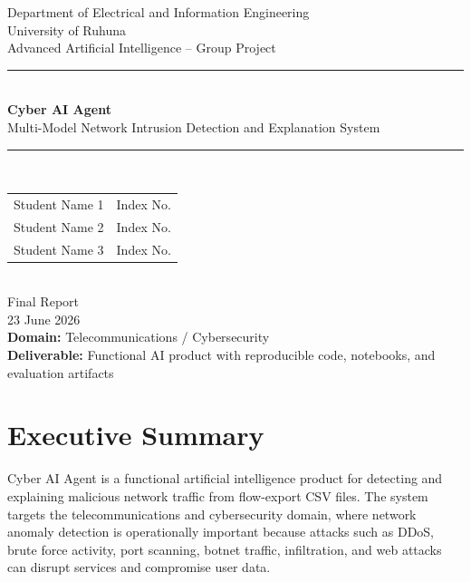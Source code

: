 \documentclass[12pt,a4paper]{article}
\begin{document}
\begin{titlepage}
    \centering
    \vspace*{0.8cm}
    {\Large Department of Electrical and Information Engineering}\\[0.25cm]
    {\Large University of Ruhuna}\\[1.2cm]
    {\Large Advanced Artificial Intelligence -- Group Project}\\[0.4cm]
    \rule{\linewidth}{0.5mm}\\[0.3cm]
    {\huge \bfseries Cyber AI Agent}\\[0.25cm]
    {\Large Multi-Model Network Intrusion Detection and Explanation System}\\[0.3cm]
    \rule{\linewidth}{0.5mm}\\[1.0cm]

    \begin{tabular}{l l}
        Student Name 1 & Index No. \\
        Student Name 2 & Index No. \\
        Student Name 3 & Index No. \\
    \end{tabular}\\[1.0cm]

    {\large Final Report}\\[0.2cm]
    {\large 23 June 2026}\\[1.0cm]

    \vfill
    \textbf{Domain:} Telecommunications / Cybersecurity\\
    \textbf{Deliverable:} Functional AI product with reproducible code, notebooks, and evaluation artifacts
    \vfill
\end{titlepage}

\newpage
\tableofcontents
\newpage
\listoffigures
\listoftables
\newpage
{}

\section{Executive Summary}

Cyber AI Agent is a functional artificial intelligence product for detecting and explaining malicious network traffic from flow-export CSV files. The system targets the telecommunications and cybersecurity domain, where network anomaly detection is operationally important because attacks such as DDoS, brute force activity, port scanning, botnet traffic, infiltration, and web attacks can disrupt services and compromise user data.
\end{document}
